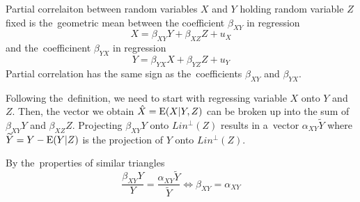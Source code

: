 
\begin{definition}
Partial correlaiton between random variables $X$ and $Y$ holding random variable $Z$
fixed is the~geometric mean between the coefficient $\beta_{XY}$ in regression
\[
X = \beta_{XY} Y + \beta_{XZ} Z + u_X
\]
and the~coefficinent $\beta_{YX}$ in regression
\[
Y = \beta_{YX} X + \beta_{YZ} Z + u_Y
\]
Partial correlation has the same sign as the~coefficients $\beta_{XY}$ and $\beta_{YX}$.
\end{definition}

Following the~definition, we need to start with regressing variable $X$ onto
$Y$ and $Z$. Then, the vector we obtain $\hat X = \operatorname{E}(X \vert Y, Z)$
can be broken up into the sum of $\beta_{XY} Y$ and $\beta_{XZ} Z$.
Projecting $\beta_{XY} Y$ onto $Lin^{\perp}(Z)$ results in a~vector
$\alpha_{XY} \widetilde Y$ where $\widetilde Y = Y - \operatorname{E}(Y \vert Z)$
is the projection of $Y$ onto $Lin^{\perp}(Z)$.


By the~properties of similar triangles
\[
\frac{\beta_{XY} Y}{Y} = \frac{\alpha_{XY} \widetilde Y}{\widetilde Y} \Leftrightarrow \beta_{XY} = \alpha_{XY}
\]

